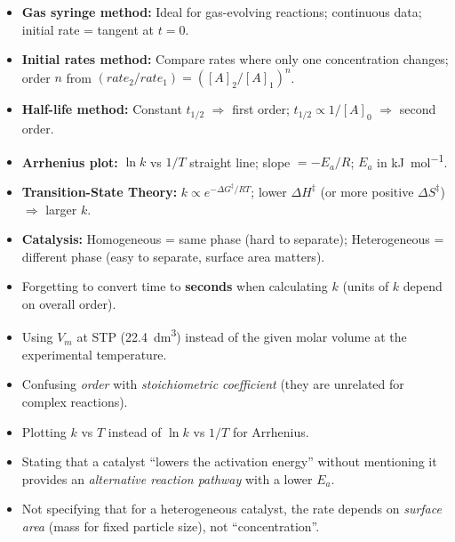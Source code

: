 \documentclass[11pt]{article}
\begin{document}
\begin{aretenir}
\begin{itemize}
    \item \textbf{Gas syringe method:} Ideal for gas-evolving reactions; continuous data; initial rate = tangent at $t=0$.
    \item \textbf{Initial rates method:} Compare rates where only one concentration changes; order $n$ from $(rate_2/rate_1) = ([A]_2/[A]_1)^n$.
    \item \textbf{Half-life method:} Constant $t_{1/2}$ $\Rightarrow$ first order; $t_{1/2} \propto 1/[A]_0$ $\Rightarrow$ second order.
    \item \textbf{Arrhenius plot:} $\ln k$ vs $1/T$ straight line; slope $= -E_a/R$; $E_a$ in \si{kJ.mol^{-1}}.
    \item \textbf{Transition-State Theory:} $k \propto e^{-\Delta G^{\ddagger}/RT}$; lower $\Delta H^{\ddagger}$ (or more positive $\Delta S^{\ddagger}$) $\Rightarrow$ larger $k$.
    \item \textbf{Catalysis:} Homogeneous = same phase (hard to separate); Heterogeneous = different phase (easy to separate, surface area matters).
\end{itemize}
\end{aretenir}

\begin{attention}
\begin{itemize}
    \item Forgetting to convert time to \textbf{seconds} when calculating $k$ (units of $k$ depend on overall order).
    \item Using $V_m$ at STP (\SI{22.4}{dm^3}) instead of the given molar volume at the experimental temperature.
    \item Confusing \emph{order} with \emph{stoichiometric coefficient} (they are unrelated for complex reactions).
    \item Plotting $k$ vs $T$ instead of $\ln k$ vs $1/T$ for Arrhenius.
    \item Stating that a catalyst ``lowers the activation energy'' without mentioning it provides an \emph{alternative reaction pathway} with a lower $E_a$.
    \item Not specifying that for a heterogeneous catalyst, the rate depends on \emph{surface area} (mass for fixed particle size), not ``concentration''.
\end{itemize}
\end{attention}
\end{document}
